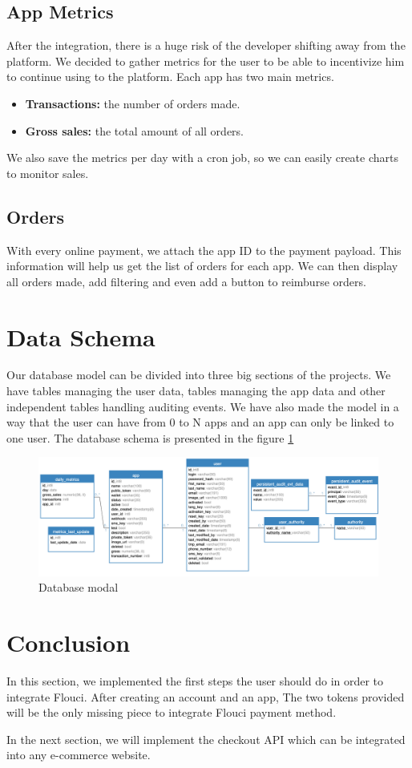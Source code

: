 \begin{spacing}{1.2}
\subsection{App Metrics}
After the integration, there is a huge  risk of the developer shifting away from the platform. We decided to gather metrics for the user to be able to incentivize him to continue using to the platform.
Each app has two main metrics.
\begin{itemize}
	\item \textbf{Transactions:} the number of orders made.
	\item \textbf{Gross sales:} the total amount of all orders.
\end{itemize}
We also save the metrics per day with a cron job, so we can easily create charts to monitor sales.

\subsection{Orders}
With every online payment, we attach the app ID to the payment payload. This information will help us get the list of orders for each app.
We can then display all orders made, add filtering and even add a button to reimburse orders.

\section{Data Schema}
Our database model can be divided into three big sections of the projects. We have tables managing the user data, tables managing the app data and other independent tables handling auditing events. We have also made the model in a way that the user can have from 0 to N apps and an app can only be linked to one user.
The database schema is presented in the figure \ref{fig:database}
\begin{figure}[H]\centering
\includegraphics[width=\textwidth,keepaspectratio]{db.png}
\caption{Database modal}
\label{fig:database}
\end{figure}

\section*{Conclusion}
In this section, we implemented the first steps the user should do in order to integrate Flouci. After creating an account and an app, The two tokens provided will be the only missing piece to integrate Flouci payment method.

In the next section, we will implement the checkout API which can be integrated into any e-commerce website.
\end{spacing}
